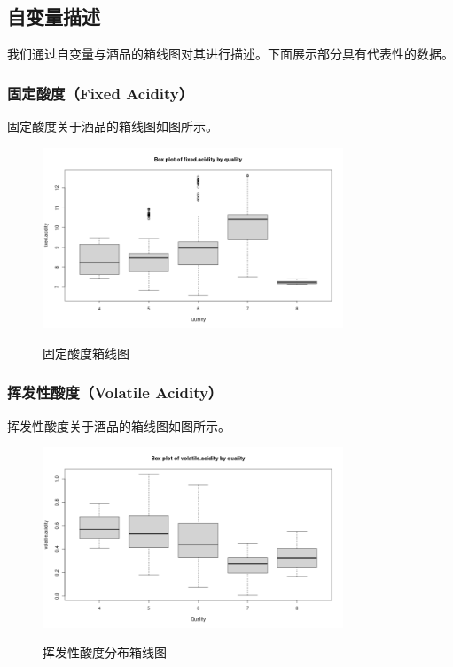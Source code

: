 \documentclass[fontset=ubuntu]{ctexart}
\begin{document}
        \subsection{自变量描述}
            我们通过自变量与酒品的箱线图对其进行描述。下面展示部分具有代表性的数据。
            \clearpage
            \subsubsection{固定酸度（Fixed Acidity）}
                固定酸度关于酒品的箱线图如图所示。
                \begin{figure}[htbp]
                    \centering
                    \includegraphics[width=0.8\textwidth]{../figures/fixed.acidity-plot.png}
                    \label{fig:fixed-acidity}
                    \caption{固定酸度箱线图}
                \end{figure}

            \subsubsection{挥发性酸度（Volatile Acidity）}
                挥发性酸度关于酒品的箱线图如图所示。
                \begin{figure}[htbp]
                    \centering
                    \includegraphics[width=0.8\textwidth]{../figures/volatile.acidity-plot.png}
                    \label{fig:volatile-acidity}
                    \caption{挥发性酸度分布箱线图}
                \end{figure}
            
\end{document}
